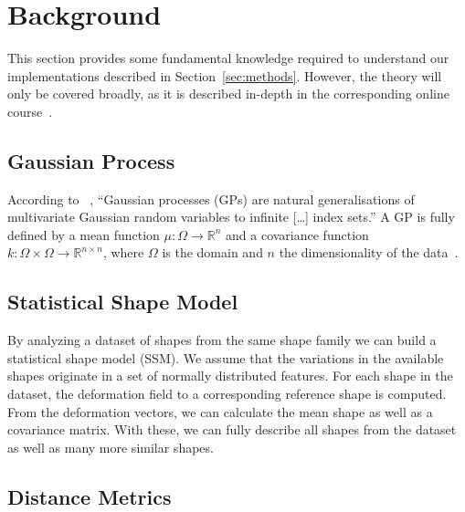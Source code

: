\section{Background}
\label{sec:background}

This section provides some fundamental knowledge required to understand our implementations described in Section~\ref{sec:methods}.
However, the theory will only be covered broadly, as it is described in-depth in the corresponding online course~\citep{mooc2019statistical}.


\subsection{Gaussian Process}
\label{subsec:gp}

According to \citeauthor{seeger2004gaussian}~\cite{seeger2004gaussian}, ``Gaussian processes (GPs) are natural generalisations of multivariate Gaussian random variables to infinite [\dots] index sets.''
A GP is fully defined by a mean function $ \mu : \Omega \rightarrow \mathbb{R}^n $ and a covariance function $k : \Omega \times \Omega \rightarrow \mathbb{R}^{n \times n} $, where $\Omega$ is the domain and $n$ the dimensionality of the data~\citep{mooc2019statistical}.



\subsection{Statistical Shape Model}
\label{subsec:ssm}

By analyzing a dataset of shapes from the same shape family we can build a statistical shape model (SSM).
We assume that the variations in the available shapes originate in a set of normally distributed features.
For each shape in the dataset, the deformation field to a corresponding reference shape is computed.
From the deformation vectors, we can calculate the mean shape as well as a covariance matrix.
With these, we can fully describe all shapes from the dataset as well as many more similar shapes.


\subsection{Distance Metrics}
\label{subsec:metrics}

